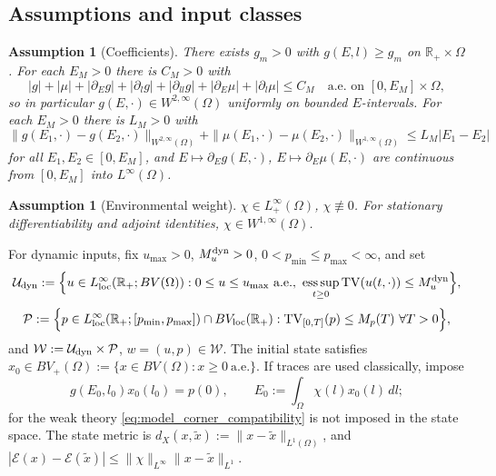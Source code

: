 \documentclass[a4paper,fleqn,longmktitle]{cas-sc}
\theoremstyle{plain}
\newtheorem{assumption}[theorem]{Assumption}
\theoremstyle{definition}
\theoremstyle{remark}
\numberwithin{equation}{section}
\begin{document}
\subsection{Assumptions and input classes}
\label{subsec:model_assumptions}
\begin{assumption}[Coefficients]
\label{ass:model_coefficients}
There exists \(g_m>0\) with \(g(E,l)\ge g_m\) on \(\mathbb R_+\times\Omega\).
For each \(E_M>0\) there is \(C_M>0\) with
\[
    |g|+|\mu|+|\partial_Eg|+|\partial_lg|+|\partial_{ll}g|
    +|\partial_E\mu|+|\partial_l\mu|
    \le C_M
    \quad
    \text{a.e. on }[0,E_M]\times\Omega,
\]
so in particular \(g(E,\cdot)\in W^{2,\infty}(\Omega)\) uniformly on bounded
\(E\)-intervals. For each \(E_M>0\) there is \(L_M>0\) with
\begin{equation}
    \label{eq:model_E_lip}
    \|g(E_1,\cdot)-g(E_2,\cdot)\|_{W^{2,\infty}(\Omega)}
    +
    \|\mu(E_1,\cdot)-\mu(E_2,\cdot)\|_{W^{1,\infty}(\Omega)}
    \le
    L_M|E_1-E_2|
\end{equation}
for all \(E_1,E_2\in[0,E_M]\), and \(E\mapsto\partial_Eg(E,\cdot)\),
\(E\mapsto\partial_E\mu(E,\cdot)\) are continuous from \([0,E_M]\) into
\(L^\infty(\Omega)\).
\end{assumption}
\begin{assumption}[Environmental weight]
\label{ass:model_chi}
\(\chi\in L^\infty_+(\Omega)\), \(\chi\not\equiv0\). For stationary
differentiability and adjoint identities, \(\chi\in W^{1,\infty}(\Omega)\).
\end{assumption}
For dynamic inputs, fix \(u_{\max}>0\), \(M_u^{\rm dyn}>0\),
\(0<p_{\min}\le p_{\max}<\infty\), and set
\[
    \mathcal U_{\rm dyn}
    :=
    \Big\{
    u\in L^\infty_{\rm loc}(\mathbb R_+;BV(\Omega)):
    0\le u\le u_{\max}\ \text{a.e.},\
    \operatorname*{ess\,sup}_{t\ge0}\operatorname{TV}(u(t,\cdot))
    \le M_u^{\rm dyn}
    \Big\},
\]
\[
    \mathcal P
    :=
    \Big\{
    p\in L^\infty_{\rm loc}(\mathbb R_+;[p_{\min},p_{\max}])
    \cap BV_{\rm loc}(\mathbb R_+):
    \operatorname{TV}_{[0,T]}(p)\le M_p(T)\ \forall T>0
    \Big\},
\]
and \(\mathcal W:=\mathcal U_{\rm dyn}\times\mathcal P\),
\(w=(u,p)\in\mathcal W\). The initial state satisfies
\(x_0\in BV_+(\Omega):=\{x\in BV(\Omega):x\ge0\ \text{a.e.}\}\). If traces are
used classically, impose
\begin{equation}
    \label{eq:model_corner_compatibility}
    g(E_0,l_0)x_0(l_0)=p(0),
    \qquad
    E_0:=\int_\Omega\chi(l)x_0(l)\,dl;
\end{equation}
for the weak theory \eqref{eq:model_corner_compatibility} is not imposed in the
state space. The state metric is
\(d_X(x,\widetilde x):=\|x-\widetilde x\|_{L^1(\Omega)}\), and
\(|\mathcal E(x)-\mathcal E(\widetilde x)|\le\|\chi\|_{L^\infty}
\|x-\widetilde x\|_{L^1}\).
\end{document}
